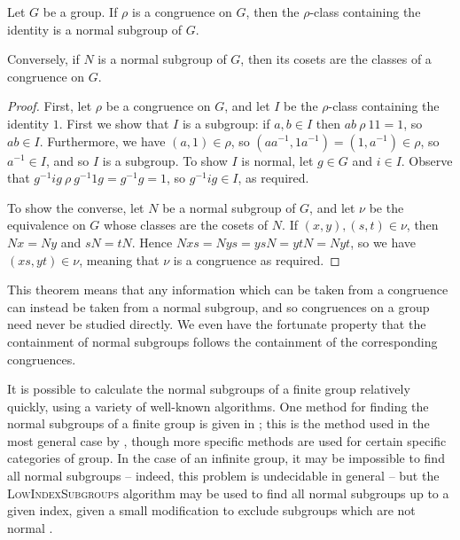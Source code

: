 \begin{theorem}
  \label{thm:normal-subgroups}
  Let $G$ be a group.  If $\rho$ is a congruence on $G$, then the $\rho$-class
  containing the identity is a normal subgroup of $G$.

  Conversely, if $N$ is a normal subgroup of $G$, then its cosets are the
  classes of a congruence on $G$.

  \begin{proof}
    First, let $\rho$ be a congruence on $G$, and let $I$ be the $\rho$-class
    containing the identity $1$.  First we show that $I$ is a subgroup: if
    $a,b \in I$ then $ab ~\rho~ 11 = 1$, so $ab \in I$.
    Furthermore, we have $(a,1) \in \rho$, so
    $(aa^{-1}, 1a^{-1}) = (1, a^{-1}) \in \rho$, so $a^{-1} \in I$, and so
    $I$ is a subgroup.  To show $I$ is normal, let $g \in G$ and $i \in I$.
    Observe that $g^{-1}ig ~\rho~ g^{-1}1g = g^{-1}g = 1$, so $g^{-1}ig \in I$,
    as required.

    To show the converse, let $N$ be a normal subgroup of $G$, and let $\nu$ be
    the equivalence on $G$ whose classes are the cosets of $N$.  If
    $(x,y), (s,t) \in \nu$, then $Nx=Ny$ and $sN=tN$.  Hence
    $Nxs=Nys=ysN=ytN=Nyt$, so we have $(xs,yt) \in \nu$, meaning that $\nu$ is
    a congruence as required.
  \end{proof}
\end{theorem}

This theorem means that any information which can be taken from a congruence can
instead be taken from a normal subgroup, and so congruences on a group need
never be studied directly.  We even have the fortunate property that the
containment of normal subgroups follows the containment of the corresponding
congruences.

It is possible to calculate the normal subgroups of a finite group relatively
quickly, using a variety of well-known algorithms.  One method for finding the
normal subgroups of a finite group is given in \cite{hulpke_1998}; this is the
method used in the most general case by \GAP{} \cite{gap}, though more specific
methods are used for certain specific categories of group.  In the case of an
infinite group, it may be impossible to find all normal subgroups -- indeed, this
problem is undecidable in general \cite[Theorem 3.17]{miller_1992} -- but the
\textsc{LowIndexSubgroups} algorithm \cite[\S 5.4]{cgt} may be used to find all
normal subgroups up to a given index, given a small modification to exclude
subgroups which are not normal \cite[\S 5.5]{cgt}.

